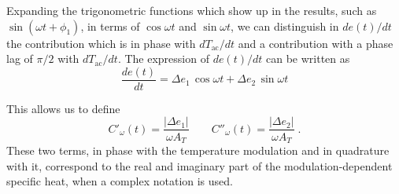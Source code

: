 \documentclass[pre,a4paper,twocolumn,superscriptaddress,%
floatfix]{revtex4}
\newcommand{\tac}{\ensuremath{T_{\mathrm{ac}}}}
\begin{document}
\smallskip
Expanding the trigonometric functions which show up in the results,
such as $\sin (\omega t + \phi_1)$, in terms of $\cos \omega t$
and $\sin \omega t$, we can distinguish in
$d e(t) / dt$ the contribution which is in phase with $d \tac / dt$
and a contribution with a phase lag of $\pi / 2$ with
$d \tac / dt$. The expression of  $d e(t) / dt$ can be written as
\begin{equation}
  \label{eq:ecossin}
  \frac{d e(t)}{dt} = \Delta e_1 \, \cos \omega t
  + \Delta e_2 \, \sin \omega t 
\end{equation}

This allows us to define
\begin{equation}
  \label{eq:cprimesec}
  C'_{\omega}(t) = \frac{ |\Delta e_1 |}{\omega A_T} \qquad
  C''_{\omega}(t) = \frac{ |\Delta e_2 |}{\omega A_T} \; .
\end{equation}
These two terms, in phase with the temperature modulation and
in quadrature with it, 
correspond to the real and imaginary part of the modulation-dependent
specific heat, when a complex notation is used.
\end{document}
